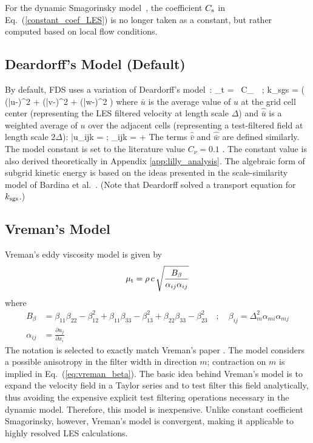 For the dynamic Smagorinsky model~\cite{Germano:1,Moin:1991}, the coefficient $C_{\rm s}$ in Eq.~(\ref{constant_coef_LES}) is no longer taken as a constant, but rather computed based on local flow conditions.

\subsection{Deardorff's Model (Default)}
\label{sec:deardorff}

By default, FDS uses a variation of Deardorff's model~\cite{Deardorff:1980}:
\be
  \mu_{\rm t} = \rho \, C_\nu \, \Delta \,  \quad ; \quad
  k_{\rm sgs} = \ha \left( (\bar{u}-)^2 + (\bar{v}-)^2 + (\bar{w}-)^2 \right)  \label{Deardorff_LES}
\ee
where $\bar{u}$ is the average value of $u$ at the grid cell center (representing the LES filtered velocity at length scale $\Delta$) and $\hat{\bar{u}}$ is a weighted average of $u$ over the adjacent cells (representing a test-filtered field at length scale $2\Delta$):
\be
   \bar{u}_{ijk} =  \quad ; \quad {}_{ijk} =  + 
\ee
The terms $\hat{\bar{v}}$ and $\hat{\bar{w}}$ are defined similarly.  The model constant is set to the literature value $C_\nu=0.1$ \cite{Pope:2000}.  The constant value is also derived theoretically in Appendix \ref{app:lilly_analysis}.  The algebraic form of subgrid kinetic energy is based on the ideas presented in the scale-similarity model of Bardina et al.~\cite{Bardina:1980}. (Note that Deardorff \cite{Deardorff:1980} solved a transport equation for $k_{\rm sgs}$.)


\subsection{Vreman's Model}
\label{sec:vreman}

Vreman's eddy viscosity model \cite{Vreman:2004} is given by
\begin{equation}
\label{eqn_mu_vreman}
\mu_{\rm t} = \rho \, c \, \sqrt{ \frac{B_\beta}{\alpha_{ij}\alpha_{ij}} }
\end{equation}
where
\begin{align}
B_\beta     &= \beta_{11}\beta_{22} - \beta_{12}^2 + \beta_{11}\beta_{33} - \beta_{13}^2 + \beta_{22}\beta_{33} - \beta_{23}^2 \quad ; \quad \beta_{ij} = \Delta_m^2 \alpha_{mi} \alpha_{mj} \label{eq:vreman_beta}\\
\alpha_{ij} &= \frac{\partial u_j}{\partial x_i}
\end{align}
The notation is selected to exactly match Vreman's paper \cite{Vreman:2004}.  The model considers a possible anisotropy in the filter width in direction $m$; contraction on $m$ is implied in Eq.~(\ref{eq:vreman_beta}).  The basic idea behind Vreman's model is to expand the velocity field in a Taylor series and to test filter this field analytically, thus avoiding the expensive explicit test filtering operations necessary in the dynamic model.  Therefore, this model is inexpensive.  Unlike constant coefficient Smagorinsky, however, Vreman's model is convergent, making it applicable to highly resolved LES calculations.

